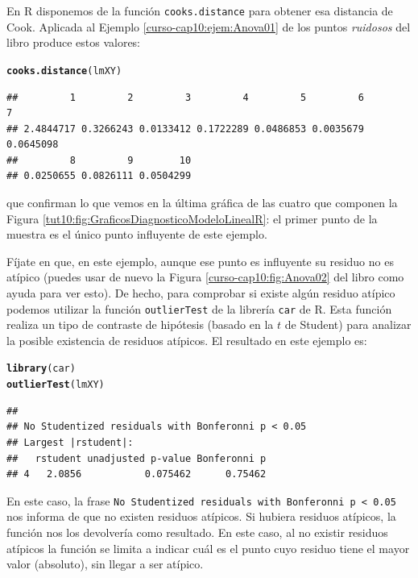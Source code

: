 \documentclass[10pt,a4paper]{article}\usepackage[]{graphicx}\usepackage[]{color}
\makeatletter
\newcommand{\hlstd}[1]{\textcolor[rgb]{0.345,0.345,0.345}{#1}}%
\newcommand{\hlkwd}[1]{\textcolor[rgb]{0.737,0.353,0.396}{\textbf{#1}}}%
\newenvironment{kframe}{%
 \def\at@end@of@kframe{}%
 \ifinner\ifhmode%
  \def\at@end@of@kframe{\end{minipage}}%
  \begin{minipage}{\columnwidth}%
 \fi\fi%
 \def\FrameCommand##1{\hskip\@totalleftmargin \hskip-\fboxsep
 \colorbox{shadecolor}{##1}\hskip-\fboxsep
     \hskip-\linewidth \hskip-\@totalleftmargin \hskip\columnwidth}%
 \MakeFramed {\advance\hsize-\width
   \@totalleftmargin\z@ \linewidth\hsize
   \@setminipage}}%
 {\par\unskip\endMakeFramed%
 \at@end@of@kframe}
\newenvironment{knitrout}{}{} %
\newcounter {cont01}
\makeatother
\begin{document}
En R disponemos de la función {\tt cooks.distance} para obtener esa distancia de Cook. Aplicada al Ejemplo \ref{curso-cap10:ejem:Anova01} de los puntos {\em ruidosos} del libro produce estos valores:
\begin{knitrout}
\color{fgcolor}\begin{kframe}
\begin{alltt}
\hlkwd{cooks.distance}\hlstd{(lmXY)}
\end{alltt}
\begin{verbatim}
##         1         2         3         4         5         6         7 
## 2.4844717 0.3266243 0.0133412 0.1722289 0.0486853 0.0035679 0.0645098 
##         8         9        10 
## 0.0250655 0.0826111 0.0504299
\end{verbatim}
\end{kframe}
\end{knitrout}
que confirman lo que vemos en la última gráfica de las cuatro que componen la Figura \ref{tut10:fig:GraficosDiagnosticoModeloLinealR}: el primer punto de la muestra es el único punto influyente de este ejemplo.

Fíjate en que, en este ejemplo, aunque ese punto es influyente su residuo no es atípico (puedes usar de nuevo la Figura \ref{curso-cap10:fig:Anova02} del libro como ayuda para ver esto).  De hecho, para comprobar si existe algún residuo atípico podemos utilizar la función {\tt outlierTest} de la librería {\tt car} de R.  Esta función realiza un tipo de contraste de hipótesis (basado en la $t$ de Student) para analizar la posible existencia de residuos atípicos. El resultado en este ejemplo es:
\begin{knitrout}
\color{fgcolor}\begin{kframe}
\begin{alltt}
\hlkwd{library}\hlstd{(car)}
\hlkwd{outlierTest}\hlstd{(lmXY)}
\end{alltt}
\begin{verbatim}
## 
## No Studentized residuals with Bonferonni p < 0.05
## Largest |rstudent|:
##   rstudent unadjusted p-value Bonferonni p
## 4   2.0856           0.075462      0.75462
\end{verbatim}
\end{kframe}
\end{knitrout}
En este caso, la frase {\tt No Studentized residuals with Bonferonni p < 0.05} nos informa de que no existen residuos atípicos. Si hubiera residuos atípicos, la función nos los devolvería como resultado. En este caso, al no existir residuos atípicos la función se limita a indicar cuál es el punto cuyo residuo tiene el mayor valor (absoluto), sin llegar a ser atípico.
\end{document}
